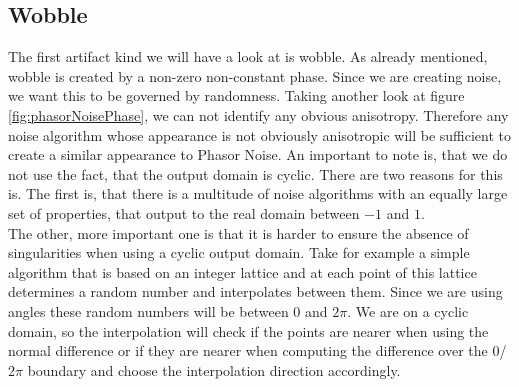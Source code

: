 \documentclass{utue} %
\begin{document}
\subsection{Wobble}
The first artifact kind we will have a look at is wobble. As already mentioned, wobble is created by a non-zero non-constant phase. Since we are creating noise, we want this to be governed by randomness. Taking another look at figure \ref{fig:phasorNoisePhase}, we can not identify any obvious anisotropy. Therefore any noise algorithm whose appearance is not obviously anisotropic will be sufficient to create a similar appearance to Phasor Noise. An important to note is, that we do not use the fact, that the output domain is cyclic. There are two reasons for this is. The first is, that there is a multitude of noise algorithms with an equally large set of properties, that output to the real domain between $-1$ and $1$.\\
The other, more important one is that it is harder to ensure the absence of singularities when using a cyclic output domain. Take for example a simple algorithm that is based on an integer lattice and at each point of this lattice determines a random number and interpolates between them. Since we are using angles these random numbers will be between $0$ and $2\pi$. We are on a cyclic domain, so the interpolation will check if the points are nearer when using the normal difference or if they are nearer when computing the difference over the $0$/$2\pi$ boundary and choose the interpolation direction accordingly.

\printbibliography
\end{document}

